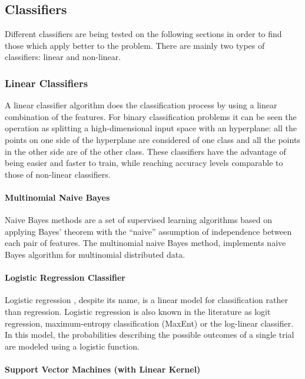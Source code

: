 \subsection{Classifiers}\label{sec:supervised:classifiers}

Different classifiers are being tested on the following sections in order to
find those which apply better to the problem. There are mainly two types of
classifiers: linear and non-linear. 

\subsubsection{Linear Classifiers}

A linear classifier algorithm does the classification process by using a linear
combination of the features. For binary classification problems it can be seen
the operation as splitting a high-dimensional input space with an hyperplane:
all the points on one side of the hyperplane are considered of one class and
all the points in the other side are of the other class. These classifiers
have the advantage of being easier and faster to train, while reaching accuracy
levels comparable to those of non-linear classifiers.

\paragraph{Multinomial Naive Bayes}

Naive Bayes \cite{Russell:2003:AIM:773294} methods are a set of supervised
learning algorithms based on applying Bayes' theorem with the ``naive''
assumption of independence between each pair of features. The multinomial naive
Bayes method, implements naive Bayes algorithm for multinomial distributed
data.

\paragraph{Logistic Regression Classifier}

Logistic regression \cite{doi:10.1093/biomet/54.1-2.167}, despite its name, is
a linear model for classification rather than regression. Logistic regression
is also known in the literature as logit regression, maximum-entropy
classification (MaxEnt) or the log-linear classifier. In this model, the
probabilities describing the possible outcomes of a single trial are modeled
using a logistic function.

\paragraph{Support Vector Machines (with Linear Kernel)}

